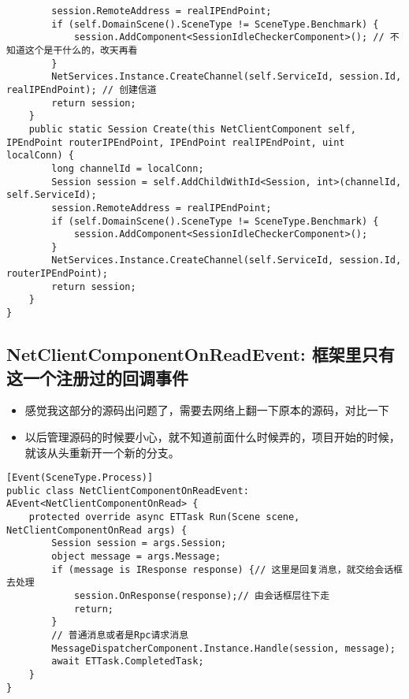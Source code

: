 \documentclass[9pt, b5paper]{article}
\begin{document}
\begin{verbatim}
        session.RemoteAddress = realIPEndPoint;
        if (self.DomainScene().SceneType != SceneType.Benchmark) {
            session.AddComponent<SessionIdleCheckerComponent>(); // 不知道这个是干什么的，改天再看
        }
        NetServices.Instance.CreateChannel(self.ServiceId, session.Id, realIPEndPoint); // 创建信道
        return session;
    }
    public static Session Create(this NetClientComponent self, IPEndPoint routerIPEndPoint, IPEndPoint realIPEndPoint, uint localConn) {
        long channelId = localConn;
        Session session = self.AddChildWithId<Session, int>(channelId, self.ServiceId);
        session.RemoteAddress = realIPEndPoint;
        if (self.DomainScene().SceneType != SceneType.Benchmark) {
            session.AddComponent<SessionIdleCheckerComponent>();
        }
        NetServices.Instance.CreateChannel(self.ServiceId, session.Id, routerIPEndPoint);
        return session;
    }
}
\end{verbatim}
\subsection{NetClientComponentOnReadEvent: 框架里只有这一个注册过的回调事件}
\label{sec-6-8}
\begin{itemize}
\item 感觉我这部分的源码出问题了，需要去网络上翻一下原本的源码，对比一下
\item 以后管理源码的时候要小心，就不知道前面什么时候弄的，项目开始的时候，就该从头重新开一个新的分支。
\end{itemize}
\begin{verbatim}
[Event(SceneType.Process)]
public class NetClientComponentOnReadEvent: AEvent<NetClientComponentOnRead> {
    protected override async ETTask Run(Scene scene, NetClientComponentOnRead args) {
        Session session = args.Session;
        object message = args.Message;
        if (message is IResponse response) {// 这里是回复消息，就交给会话框去处理
            session.OnResponse(response);// 由会话框层往下走
            return;
        }
        // 普通消息或者是Rpc请求消息
        MessageDispatcherComponent.Instance.Handle(session, message);
        await ETTask.CompletedTask;
    }
}
\end{verbatim}
\end{document}

